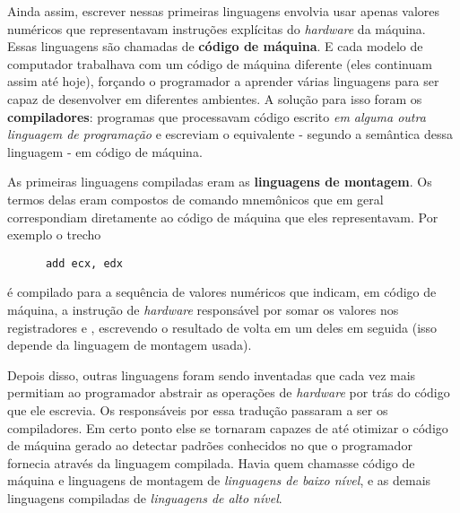     Ainda assim, escrever nessas primeiras linguagens envolvia usar apenas valores
    numéricos que representavam instruções explícitas do \emph{hardware} da
    máquina. Essas linguagens são chamadas de \textbf{código de máquina}. E cada
    modelo de computador trabalhava com um código de máquina diferente (eles
    continuam assim até hoje), forçando o programador a aprender várias linguagens
    para ser capaz de desenvolver em diferentes ambientes. A solução para isso
    foram os \textbf{compiladores}: programas que processavam código escrito
    \emph{em alguma outra linguagem de programação} e escreviam o equivalente -
    segundo a semântica dessa linguagem - em código de máquina.


    As primeiras linguagens compiladas eram as \textbf{linguagens de montagem}. Os
    termos delas eram compostos de comando mnemônicos que em geral correspondiam
    diretamente ao código de máquina que eles representavam. Por exemplo o trecho

    \begin{verbatim}
      add ecx, edx\end{verbatim}

    \hspace{-16pt}é compilado para a sequência de valores numéricos que indicam,
    em código de máquina, a instrução de \emph{hardware} responsável por somar os
    valores nos registradores  e , escrevendo o resultado de
    volta em um deles em seguida (isso depende da linguagem de montagem usada).

    Depois disso, outras linguagens foram sendo inventadas que cada vez mais
    permitiam ao programador abstrair as operações de \emph{hardware} por trás
    do código que ele escrevia. Os responsáveis por essa tradução passaram a ser
    os compiladores. Em certo ponto else se tornaram capazes de até otimizar o
    código de máquina gerado ao detectar padrões conhecidos no que o programador
    fornecia através da linguagem compilada. Havia quem chamasse código de máquina
    e linguagens de montagem de \emph{linguagens de baixo nível}, e as demais
    linguagens compiladas de \emph{linguagens de alto nível}.


